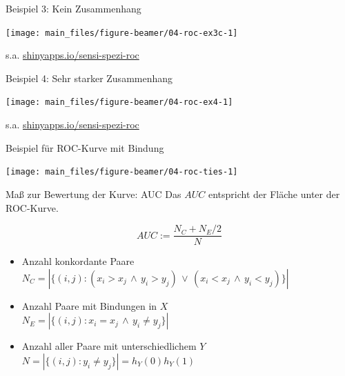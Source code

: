 \documentclass[
  10pt,
  ignorenonframetext,
]{beamer}
\providecommand{\tightlist}{%
  \setlength{\itemsep}{0pt}\setlength{\parskip}{0pt}}
\begin{document}
\begin{frame}{Beispiel 3: Kein Zusammenhang}
\label{beispiel-3-kein-zusammenhang-2}
\scriptsize

\begin{center}\texttt{[image: main\_files/figure-beamer/04-roc-ex3c-1]} \end{center}

\normalsize
\tiny

s.a.
\href{https://fabian-s.shinyapps.io/sensi-spezi-roc/}{shinyapps.io/sensi-spezi-roc}
\end{frame}

\begin{frame}{Beispiel 4: Sehr starker Zusammenhang}
\label{beispiel-4-sehr-starker-zusammenhang}
\scriptsize

\begin{center}\texttt{[image: main\_files/figure-beamer/04-roc-ex4-1]} \end{center}

\normalsize
\tiny

s.a.
\href{https://fabian-s.shinyapps.io/sensi-spezi-roc/}{shinyapps.io/sensi-spezi-roc}
\end{frame}

\begin{frame}{Beispiel für ROC-Kurve mit Bindung}
\label{beispiel-fuxfcr-roc-kurve-mit-bindung}
\scriptsize

\begin{center}\texttt{[image: main\_files/figure-beamer/04-roc-ties-1]} \end{center}

\normalsize
\end{frame}

\begin{frame}{Maß zur Bewertung der Kurve: AUC}
\label{mauxdf-zur-bewertung-der-kurve-auc}
Das \(AUC\) entspricht der Fläche unter der ROC-Kurve.

\[AUC :=\frac{N_C + N_E/2}{N}\]

\begin{itemize}
\tightlist
\item
  Anzahl konkordante Paare\\
  \(N_C =  |\{(i,j): (x_i > x_j \,\land\, y_i > y_j) \,\lor\, (x_i < x_j \,\land\, y_i < y_j)\} |\)
\item
  Anzahl Paare mit Bindungen in \(X\)\\
  \(N_E =  |\{(i,j): x_i = x_j \,\land\, y_i \neq y_j\} |\)
\item
  Anzahl aller Paare mit unterschiedlichem \(Y\)\\
  \(N = |\{(i,j): y_i \neq y_j\} | = h_Y(0)h_Y(1)\)
\end{itemize}
\end{frame}
\end{document}
